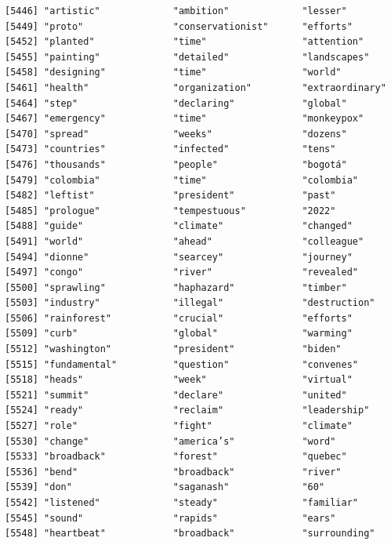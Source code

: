 \documentclass[
  letterpaper,
  DIV=11,
  numbers=noendperiod]{scrartcl}
\begin{document}
\begin{verbatim}
[5446] "artistic"             "ambition"             "lesser"              
[5449] "proto"                "conservationist"      "efforts"             
[5452] "planted"              "time"                 "attention"           
[5455] "painting"             "detailed"             "landscapes"          
[5458] "designing"            "time"                 "world"               
[5461] "health"               "organization"         "extraordinary"       
[5464] "step"                 "declaring"            "global"              
[5467] "emergency"            "time"                 "monkeypox"           
[5470] "spread"               "weeks"                "dozens"              
[5473] "countries"            "infected"             "tens"                
[5476] "thousands"            "people"               "bogotá"              
[5479] "colombia"             "time"                 "colombia"            
[5482] "leftist"              "president"            "past"                
[5485] "prologue"             "tempestuous"          "2022"                
[5488] "guide"                "climate"              "changed"             
[5491] "world"                "ahead"                "colleague"           
[5494] "dionne"               "searcey"              "journey"             
[5497] "congo"                "river"                "revealed"            
[5500] "sprawling"            "haphazard"            "timber"              
[5503] "industry"             "illegal"              "destruction"         
[5506] "rainforest"           "crucial"              "efforts"             
[5509] "curb"                 "global"               "warming"             
[5512] "washington"           "president"            "biden"               
[5515] "fundamental"          "question"             "convenes"            
[5518] "heads"                "week"                 "virtual"             
[5521] "summit"               "declare"              "united"              
[5524] "ready"                "reclaim"              "leadership"          
[5527] "role"                 "fight"                "climate"             
[5530] "change"               "america’s"            "word"                
[5533] "broadback"            "forest"               "quebec"              
[5536] "bend"                 "broadback"            "river"               
[5539] "don"                  "saganash"             "60"                  
[5542] "listened"             "steady"               "familiar"            
[5545] "sound"                "rapids"               "ears"                
[5548] "heartbeat"            "broadback"            "surrounding"         

\end{verbatim}
\end{document}
